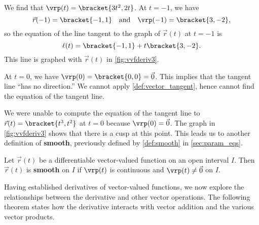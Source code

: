 {We find that $\vrp(t) =\bracket{3t^2,2t}$. At $t=-1$, we have
\[\vec r(-1) =\bracket{-1,1}\quad \text{and}\quad \vrp(-1) =\bracket{3,-2},\]
so the equation of the line tangent to the graph of $\vec r(t)$ at $t=-1$ is
\[\ell(t) =\bracket{-1,1}+ t\bracket{3,-2}.\]
This line is graphed with $\vec r(t)$ in \autoref{fig:vvfderiv3}.

At $t=0$, we have $\vrp(0) =\bracket{0,0}=\vec 0$. This implies that the tangent line ``has no direction.'' We cannot apply \autoref{def:vector_tangent}, hence cannot find the equation of the tangent line.}


We were unable to compute the equation of the tangent line to $\vec r(t)=\bracket{t^3,t^2}$ at $t=0$ because $\vrp(0) = \vec 0$. The graph in \autoref{fig:vvfderiv3} shows that there is a cusp at this point. This leads us to another definition of \textbf{smooth}, previously defined by \autoref{def:smooth} in \autoref{sec:param_eqs}.

{Let $\vec r(t)$ be a differentiable vector-valued function on an open interval $I$. Then $\vec r(t)$ is \textbf{smooth} on $I$ if $\vrp(t)$ is continuous and $\vrp(t)\neq \vec 0$ on $I$.
}

Having established derivatives of vector-valued functions, we now explore the relationships between the derivative and other vector operations. The following theorem states how the derivative interacts with vector addition and the various vector products.

